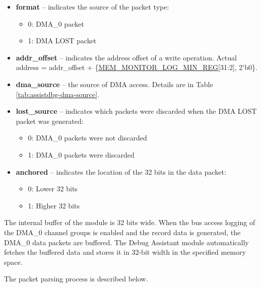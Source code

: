 \documentclass[main\_\_EN.tex]{subfiles}
\begin{document}
\begin{itemize}
    \item \textbf{format} – indicates the source of the packet type:
    \begin{itemize}
        \item 0: DMA\_0 packet
        \item 1: DMA LOST packet
    \end{itemize}
    \item \textbf{addr\_offset} – indicates the address offset of a write operation. Actual address = addr\_offset + \{\hyperref[regdesc:MEMMONITORLOGMINREG]{MEM\_MONITOR\_LOG\_MIN\_REG}[31:2], 2'b0\}.
    \item \textbf{dma\_source} – the source of DMA access. Details are in Table \ref{tab:assistdbg-dma-source}.
    \item \textbf{lost\_source} – indicates which packets were discarded when the DMA LOST packet was generated:
    \begin{itemize}
        \item 0: DMA\_0 packets were not discarded
        \item 1: DMA\_0 packets were discarded
    \end{itemize}
    \item \textbf{anchored} – indicates the location of the 32 bits in the data packet:
    \begin{itemize}
        \item 0: Lower 32 bits
        \item 1: Higher 32 bits
    \end{itemize}
\end{itemize}

The internal buffer of the module is 32 bits wide. When the bus access logging of the DMA\_0 channel groups is enabled and the record data is generated, the DMA\_0 data packets are buffered. The Debug Assistant module automatically fetches the buffered data and stores it in 32-bit width in the specified memory space.

The packet parsing process is described below.
\end{document}
